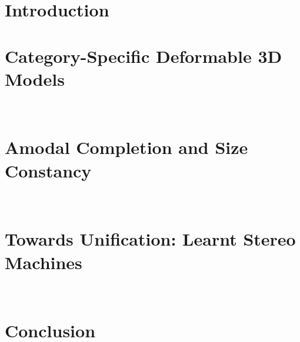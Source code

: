 \documentclass[12pt, oneside]{lib/ucthesis}
\def\ssp{\def\baselinestretch{1.0}\large\normalsize}
\begin{document}
\tableofcontents

\begin{acknowledgements}
\thispagestyle{plain}
\end{acknowledgements}




\begin{dissertationText}
\chapter{Introduction}
	

\chapter{Category-Specific Deformable 3D Models}~\label{chapter:CategoryShapes}
	

\chapter{Amodal Completion and Size Constancy}~\label{chapter:Amodal}
	

\chapter[Learnt Stereo Machines]{Towards Unification: Learnt Stereo Machines}~\label{chapter:LSM}
	
	
\chapter{Conclusion}
	

\ssp
% 



% 	

\end{dissertationText}
\end{document}
